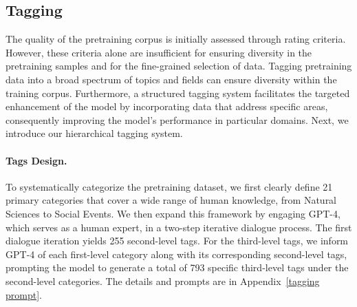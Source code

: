 \documentclass[11pt]{article}
\begin{document}
\subsection{Tagging}
The quality of the pretraining corpus is initially assessed through rating criteria. However, these criteria alone are insufficient for ensuring diversity in the pretraining samples and for the fine-grained selection of data. 
Tagging pretraining data into a broad spectrum of topics and fields can ensure diversity within the training corpus. 
Furthermore, a structured tagging system facilitates the targeted enhancement of the model by incorporating data that address specific areas, consequently improving the model's performance in particular domains. Next, we introduce our hierarchical tagging system.

\paragraph{Tags Design.}
To systematically categorize the pretraining dataset, we first clearly define 21 primary categories that cover a wide range of human knowledge, from Natural Sciences to Social Events. We then expand this framework by engaging GPT-4, which serves as a human expert, in a two-step iterative dialogue process. 
The first dialogue iteration yields 255 second-level tags.
For the third-level tags, we inform GPT-4 of each first-level category along with its corresponding second-level tags, prompting the model to generate a total of 793 specific third-level tags under the second-level categories. 
The details and prompts are in Appendix~\ref{tagging prompt}.
\end{document}
